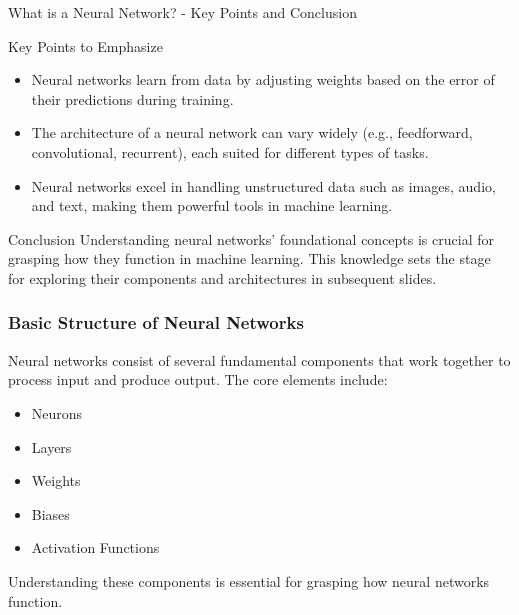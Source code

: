 \documentclass[aspectratio=169]{beamer}
\begin{document}
\begin{frame}[fragile]{What is a Neural Network? - Key Points and Conclusion}
    \begin{block}{Key Points to Emphasize}
        \begin{itemize}
            \item Neural networks learn from data by adjusting weights based on the error of their predictions during training.
            \item The architecture of a neural network can vary widely (e.g., feedforward, convolutional, recurrent), each suited for different types of tasks.
            \item Neural networks excel in handling unstructured data such as images, audio, and text, making them powerful tools in machine learning.
        \end{itemize}
    \end{block}
    
    \begin{block}{Conclusion}
        Understanding neural networks' foundational concepts is crucial for grasping how they function in machine learning. This knowledge sets the stage for exploring their components and architectures in subsequent slides.
    \end{block}
\end{frame}

\begin{frame}[fragile]
  \frametitle{Basic Structure of Neural Networks}
  Neural networks consist of several fundamental components that work together to process input and produce output. The core elements include:
  \begin{itemize}
    \item Neurons
    \item Layers
    \item Weights
    \item Biases
    \item Activation Functions
  \end{itemize}
  Understanding these components is essential for grasping how neural networks function.
\end{frame}
\end{document}
